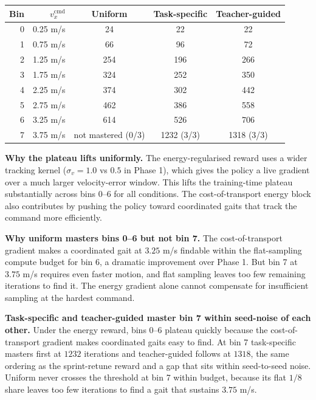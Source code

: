 \documentclass[a4paper,11pt]{article}
\begin{document}
    \begin{center}
    \begin{tabular}{@{}r r c c c@{}}
    \toprule
    \textbf{Bin} & $v_x^{\mathrm{cmd}}$ & \textbf{Uniform} & \textbf{Task-specific} & \textbf{Teacher-guided} \\
    \midrule
    0 & 0.25 m/s & 24  & 22  & 22 \\
    1 & 0.75 m/s & 66  & 96  & 72 \\
    2 & 1.25 m/s & 254 & 196 & 266 \\
    3 & 1.75 m/s & 324 & 252 & 350 \\
    4 & 2.25 m/s & 374 & 302 & 442 \\
    5 & 2.75 m/s & 462 & 386 & 558 \\
    6 & 3.25 m/s & 614 & 526 & 706 \\
    7 & 3.75 m/s & not mastered (0/3) & 1232 (3/3) & 1318 (3/3) \\
    \bottomrule
    \end{tabular}
    \label{tab:phase2_itm}
    \end{center}

    \textbf{Why the plateau lifts uniformly.} The energy-regularised reward uses a wider tracking kernel ($\sigma_v = 1.0$ vs $0.5$ in Phase 1), which gives the policy a live gradient over a much larger velocity-error window. This lifts the training-time plateau substantially across bins 0--6 for all conditions. The cost-of-transport energy block also contributes by pushing the policy toward coordinated gaits that track the command more efficiently.

    \textbf{Why uniform masters bins 0--6 but not bin 7.} The cost-of-transport gradient makes a coordinated gait at $3.25$ m/s findable within the flat-sampling compute budget for bin 6, a dramatic improvement over Phase 1. But bin 7 at $3.75$ m/s requires even faster motion, and flat sampling leaves too few remaining iterations to find it. The energy gradient alone cannot compensate for insufficient sampling at the hardest command.

    \textbf{Task-specific and teacher-guided master bin 7 within seed-noise of each other.} Under the energy reward, bins 0--6 plateau quickly because the cost-of-transport gradient makes coordinated gaits easy to find. At bin 7 task-specific masters first at $1232$ iterations and teacher-guided follows at $1318$, the same ordering as the sprint-retune reward and a gap that sits within seed-to-seed noise. Uniform never crosses the threshold at bin 7 within budget, because its flat $1/8$ share leaves too few iterations to find a gait that sustains $3.75$ m/s.
\end{document}
